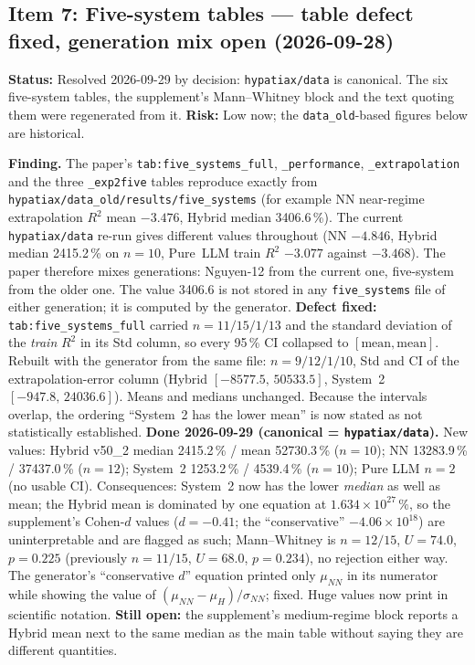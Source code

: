 \documentclass[11pt]{article}
\begin{document}
\subsection*{Item 7: Five-system tables --- table defect fixed, generation mix open (2026-09-28)}
\textbf{Status:} Resolved 2026-09-29 by decision: \texttt{hypatiax/data} is canonical. The six
five-system tables, the supplement's Mann--Whitney block and the text quoting them were regenerated from it.
\textbf{Risk:} Low now; the \texttt{data\_old}-based figures below are historical.

\textbf{Finding.} The paper's \texttt{tab:five\_systems\_full}, \texttt{\_performance},
\texttt{\_extrapolation} and the three \texttt{\_exp2five} tables reproduce exactly from
\texttt{hypatiax/data\_old/results/five\_systems} (for example NN near-regime extrapolation
$R^2$ mean $-3.476$, Hybrid median 3406.6\,\%). The current \texttt{hypatiax/data} re-run gives different
values throughout (NN $-4.846$, Hybrid median 2415.2\,\% on $n=10$, Pure~LLM train $R^2$
$-3.077$ against $-3.468$). The paper therefore mixes generations: Nguyen-12 from the current
one, five-system from the older one. The value 3406.6 is not stored in any \texttt{five\_systems} file of either
generation; it is computed by the generator.
\textbf{Defect fixed:} \texttt{tab:five\_systems\_full} carried $n=11/15/1/13$ and the standard
deviation of the \emph{train} $R^2$ in its Std column, so every 95\,\% CI collapsed to
$[\text{mean},\text{mean}]$. Rebuilt with the generator from the same file: $n=9/12/1/10$, Std and CI of the
extrapolation-error column (Hybrid $[-8577.5,\,50533.5]$, System~2 $[-947.8,\,24036.6]$). Means and
medians unchanged. Because the intervals overlap, the ordering ``System~2 has the lower mean'' is now
stated as not statistically established.
\textbf{Done 2026-09-29 (canonical = \texttt{hypatiax/data}).} New values: Hybrid v50\_2 median 2415.2\,\% /
mean 52730.3\,\% ($n=10$); NN 13283.9\,\% / 37437.0\,\% ($n=12$); System~2 1253.2\,\% / 4539.4\,\% ($n=10$);
Pure LLM $n=2$ (no usable CI). Consequences: System~2 now has the lower \emph{median} as well as mean; the Hybrid mean
is dominated by one equation at $1.634\times10^{27}\,\%$, so the supplement's Cohen-$d$ values ($d=-0.41$; the
``conservative'' $-4.06\times10^{18}$) are uninterpretable and are flagged as such; Mann--Whitney is $n=12/15$,
$U=74.0$, $p=0.225$ (previously $n=11/15$, $U=68.0$, $p=0.234$), no rejection either way. The generator's
``conservative $d$'' equation printed only $\mu_{NN}$ in its numerator while showing the value of
$(\mu_{NN}-\mu_H)/\sigma_{NN}$; fixed. Huge values now print in scientific notation.
\textbf{Still open:} the supplement's medium-regime block reports a Hybrid mean next to the same median as the main table
without saying they are different quantities.
\end{document}
